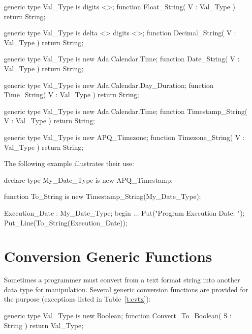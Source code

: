 \documentclass[english,letterpaper]{book}
\begin{document}
\begin{Code}
generic
   type Val_Type is digits <>;
function Float_String(
   V : Val_Type
) return String;
\end{Code}

\begin{Code}
generic
   type Val_Type is delta <> digits <>;
function Decimal_String(
   V : Val_Type
) return String;
\end{Code}

\begin{Code}
generic
   type Val_Type is new Ada.Calendar.Time;
function Date_String(
   V : Val_Type
) return String;
\end{Code}

\begin{Code}
generic
   type Val_Type is new Ada.Calendar.Day_Duration;
function Time_String(
   V : Val_Type
) return String;
\end{Code}

\begin{Code}
generic
   type Val_Type is new Ada.Calendar.Time;
function Timestamp_String(
   V : Val_Type
) return String;
\end{Code}

\begin{Code}
generic
   type Val_Type is new APQ_Timezone;
function Timezone_String(
   V : Val_Type
) return String;
\end{Code}

The following example illustrates their use:

\begin{Example}
declare
   type My_Date_Type is new APQ_Timestamp;

   function To_String is new 
      Timestamp_String(My_Date_Type);

   Execution_Date : My_Date_Type;
begin
   ...
   Put("Program Execution Date: ");
   Put_Line(To_String(Execution_Date));
\end{Example}

\section{Conversion Generic Functions}

Sometimes a programmer must convert from a text format string into
another data type for manipulation. Several generic conversion  functions are
provided for the purpose (exceptions listed in Table~\ref{t:cvtx}):

\begin{Code}
generic
   type Val_Type is new Boolean;
function Convert_To_Boolean(
   S : String
) return Val_Type;
\end{Code}
\end{document}
